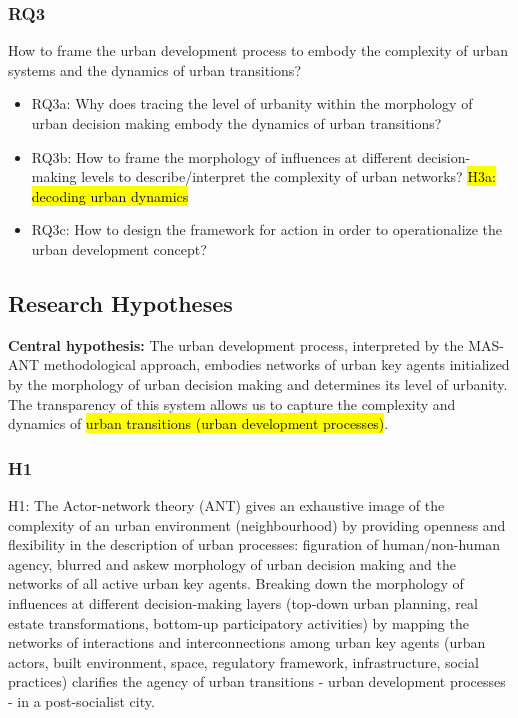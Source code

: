 \documentclass[11pt]{report}
\begin{document}
\subsubsection{RQ3}
How to frame the urban development process to embody the complexity of urban systems and the dynamics of urban transitions?
\begin{itemize}
\item RQ3a: Why does tracing the level of urbanity within the morphology of urban decision making embody the dynamics of urban transitions?
\item RQ3b: How to frame the morphology of influences at different decision-making levels to describe/interpret the complexity of urban networks?  \hl{H3a: decoding urban dynamics}
\item RQ3c: How to design the framework for action in order to operationalize the urban development concept?
\end {itemize}

\subsection{Research Hypotheses}
\textbf{Central hypothesis:} The urban development process, interpreted by the MAS-ANT methodological approach, embodies networks of urban key agents initialized by the morphology of urban decision making and determines its level of urbanity.
The transparency of this system allows us to  capture the complexity and dynamics of \hl{urban transitions (urban development processes)}. 

\subsubsection{H1}

H1: The Actor-network theory (ANT) gives an exhaustive image of the complexity of an urban environment (neighbourhood) by providing openness and flexibility in the description of urban processes: figuration of human/non-human agency, blurred and askew morphology of urban decision making and the networks of all active urban key agents.
Breaking  down  the morphology of influences at different decision-making layers (top-down urban planning, real estate transformations, bottom-up participatory activities) by mapping the networks of interactions and interconnections among urban key agents (urban actors, built environment, space, regulatory framework, infrastructure, 
social practices) clarifies the agency of urban transitions - urban development processes - in a post-socialist city.
\end{document}
